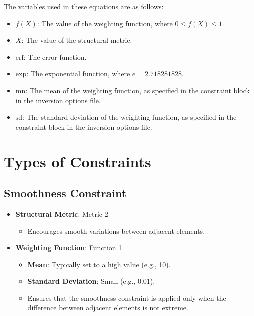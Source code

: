 \documentclass[a4paper,12pt]{article}
\begin{document}
The variables used in these equations are as follows:

\begin{itemize}
    \item \(f(X)\): The value of the weighting function, where \(0 \leq f(X) \leq 1\).
    \item \(X\): The value of the structural metric.
    \item \(\text{erf}\): The error function.
    \item \(\text{exp}\): The exponential function, where \(e = 2.718281828\).
    \item \(\text{mn}\): The mean of the weighting function, as specified in the constraint block in the inversion options file.
    \item \(\text{sd}\): The standard deviation of the weighting function, as specified in the constraint block in the inversion options file.
\end{itemize}

\section{Types of Constraints}

\subsection{Smoothness Constraint}
\begin{itemize}
    \item \textbf{Structural Metric}: Metric 2
    \begin{itemize}
        \item Encourages smooth variations between adjacent elements.
    \end{itemize}
    \item \textbf{Weighting Function}: Function 1
    \begin{itemize}
        \item \textbf{Mean}: Typically set to a high value (e.g., 10).
        \item \textbf{Standard Deviation}: Small (e.g., 0.01).
        \item Ensures that the smoothness constraint is applied only when the difference between adjacent elements is not extreme.
    \end{itemize}
\end{itemize}
\end{document}
